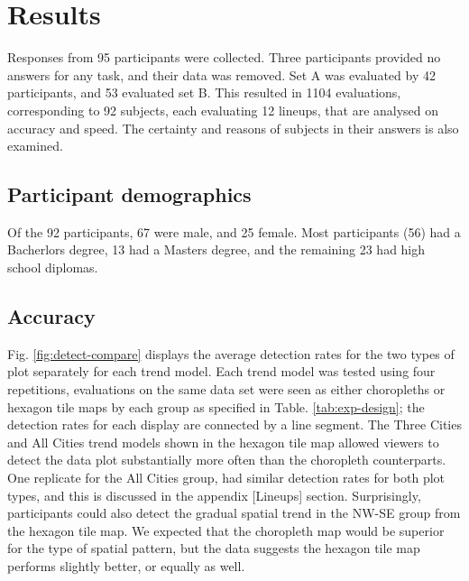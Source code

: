 \documentclass[conference,final,]{IEEEtran}
\begin{document}
\hypertarget{results}{%
\section{Results}\label{results}}

Responses from 95 participants were collected. Three participants provided no answers for any task, and their data was removed. Set A was evaluated by 42 participants, and 53 evaluated set B. This resulted in 1104 evaluations, corresponding to 92 subjects, each evaluating 12 lineups, that are analysed on accuracy and speed. The certainty and reasons of subjects in their answers is also examined.

\hypertarget{participant-demographics}{%
\subsection{Participant demographics}\label{participant-demographics}}

Of the 92 participants, 67 were male, and 25 female. Most participants (56) had a Bacherlors degree, 13 had a Masters degree, and the remaining 23 had high school diplomas.

\hypertarget{accuracy}{%
\subsection{Accuracy}\label{accuracy}}

Fig. \ref{fig:detect-compare} displays the average detection rates for the two types of plot separately for each trend model. Each trend model was tested using four repetitions, evaluations on the same data set were seen as either choropleths or hexagon tile maps by each group as specified in Table. \ref{tab:exp-design}; the detection rates for each display are connected by a line segment. The Three Cities and All Cities trend models shown in the hexagon tile map allowed viewers to detect the data plot substantially more often than the choropleth counterparts. One replicate for the All Cities group, had similar detection rates for both plot types, and this is discussed in the appendix {[}Lineups{]} section. Surprisingly, participants could also detect the gradual spatial trend in the NW-SE group from the hexagon tile map. We expected that the choropleth map would be superior for the type of spatial pattern, but the data suggests the hexagon tile map performs slightly better, or equally as well.
\end{document}
